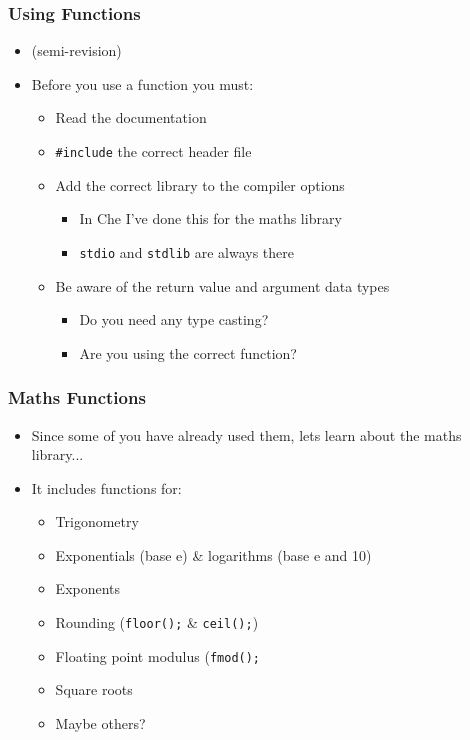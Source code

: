 \documentclass[14pt]{beamer}
\begin{document}
\begin{frame}
\frametitle{Using Functions}
\begin{itemize}
\item (semi-revision)
\item Before you use a function you must:
	\begin{itemize}
		\item Read the documentation
		\item \texttt{\#include} the correct header file
		\item Add the correct library to the compiler options
			\begin{itemize}
				\item In Che I've done this for the maths library
				\item \texttt{stdio} and \texttt{stdlib} are always there
			\end{itemize}
		\item Be aware of the return value and argument data types
			\begin{itemize}
				\item Do you need any type casting?
				\item Are you using the correct function?
			\end{itemize}
	\end{itemize}
\end{itemize}
\end{frame}

\begin{frame}
\frametitle{Maths Functions}
\begin{itemize}
\item Since some of you have already used them, lets learn about the maths library...
\item It includes functions for:
	\begin{itemize}
		\item Trigonometry
		\item Exponentials (base e) \& logarithms (base e and 10)
		\item Exponents
		\item Rounding (\texttt{floor();} \& \texttt{ceil();})
		\item Floating point modulus (\texttt{fmod();}
		\item Square roots
		\item Maybe others?
	\end{itemize}
\end{itemize}
\end{frame}
\end{document}
